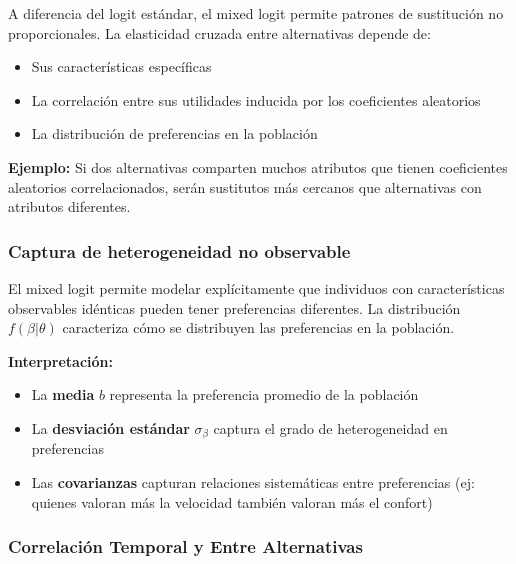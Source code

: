 \documentclass[
]{book}
\providecommand{\tightlist}{%
  \setlength{\itemsep}{0pt}\setlength{\parskip}{0pt}}
\begin{document}
A diferencia del logit estándar, el mixed logit permite patrones de sustitución no proporcionales. La elasticidad cruzada entre alternativas depende de:

\begin{itemize}
\tightlist
\item
  Sus características específicas
\item
  La correlación entre sus utilidades inducida por los coeficientes aleatorios
\item
  La distribución de preferencias en la población
\end{itemize}

\textbf{Ejemplo:} Si dos alternativas comparten muchos atributos que tienen coeficientes aleatorios correlacionados, serán sustitutos más cercanos que alternativas con atributos diferentes.

\hypertarget{captura-de-heterogeneidad-no-observable}{%
\subsubsection{Captura de heterogeneidad no observable}\label{captura-de-heterogeneidad-no-observable}}

El mixed logit permite modelar explícitamente que individuos con características observables idénticas pueden tener preferencias diferentes. La distribución \(f(\beta|\theta)\) caracteriza cómo se distribuyen las preferencias en la población.

\textbf{Interpretación:}

\begin{itemize}
\tightlist
\item
  La \textbf{media} \(b\) representa la preferencia promedio de la población
\item
  La \textbf{desviación estándar} \(\sigma_\beta\) captura el grado de heterogeneidad en preferencias
\item
  Las \textbf{covarianzas} capturan relaciones sistemáticas entre preferencias (ej: quienes valoran más la velocidad también valoran más el confort)
\end{itemize}

\hypertarget{correlaciuxf3n-temporal-y-entre-alternativas}{%
\subsubsection{Correlación Temporal y Entre Alternativas}\label{correlaciuxf3n-temporal-y-entre-alternativas}}
\end{document}
